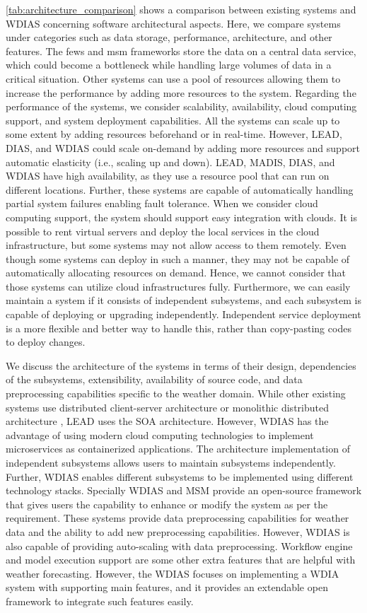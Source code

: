 \cref{tab:architecture_comparison} shows a comparison between existing systems and WDIAS concerning software architectural aspects. Here, we compare systems under categories such as data storage, performance, architecture, and other features. The \acrshort{fews} and \acrshort{msm} frameworks store the data on a central data service, which could become a bottleneck while handling large volumes of data in a critical situation. Other systems can use a pool of resources allowing them to increase the performance by adding more resources to the system. Regarding the performance of the systems, we consider scalability, availability, cloud computing support, and system deployment capabilities. All the systems can scale up to some extent by adding resources beforehand or in real-time. However, LEAD, DIAS, and WDIAS could scale on-demand by adding more resources and support automatic elasticity (i.e., scaling up and down). LEAD, MADIS, DIAS, and WDIAS have high availability, as they use a resource pool that can run on different locations. Further, these systems are capable of automatically handling partial system failures enabling fault tolerance. When we consider cloud computing support, the system should support easy integration with clouds. It is possible to rent virtual servers and deploy the local services in the cloud infrastructure, but some systems may not allow access to them remotely. Even though some systems can deploy in such a manner, they may not be capable of automatically allocating resources on demand. Hence, we cannot consider that those systems can utilize cloud infrastructures fully. Furthermore, we can easily maintain a system if it consists of independent subsystems, and each subsystem is capable of deploying or upgrading independently. Independent service deployment is a more flexible and better way to handle this, rather than copy-pasting codes to deploy changes.

We discuss the architecture of the systems in terms of their design, dependencies of the subsystems, extensibility, availability of source code, and data preprocessing capabilities specific to the weather domain. While other existing systems use distributed client-server architecture or monolithic distributed architecture \cite{ChristensenBenDontMonolith}, LEAD uses the SOA architecture. However, WDIAS has the advantage of using modern cloud computing technologies to implement microservices as containerized applications. The architecture implementation of independent subsystems allows users to maintain subsystems independently. Further, WDIAS enables different subsystems to be implemented using different technology stacks. Specially WDIAS and MSM provide an open-source framework that gives users the capability to enhance or modify the system as per the requirement. These systems provide data preprocessing capabilities for weather data and the ability to add new preprocessing capabilities. However, WDIAS is also capable of providing auto-scaling with data preprocessing. Workflow engine and model execution support are some other extra features that are helpful with weather forecasting. However, the WDIAS focuses on implementing a WDIA system with supporting main features, and it provides an extendable open framework to integrate such features easily.
